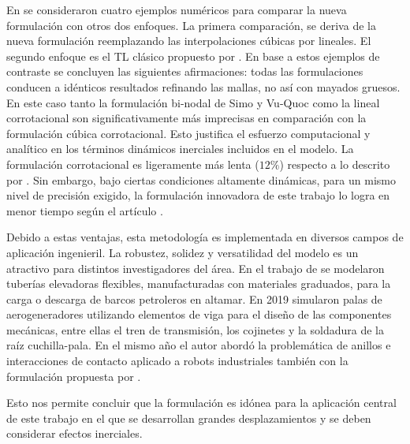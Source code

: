 En \cite{Le2014} se consideraron cuatro ejemplos numéricos para comparar la nueva formulación con otros dos enfoques. La primera comparación, se deriva de la nueva formulación reemplazando las interpolaciones cúbicas por lineales. El segundo enfoque es el TL clásico propuesto por \cite{simo1988dynamics}. En base a estos ejemplos de contraste se concluyen las siguientes afirmaciones: todas las formulaciones conducen a idénticos resultados refinando las mallas, no así con mayados gruesos. En este caso tanto la formulación bi-nodal de Simo y Vu-Quoc como la lineal corrotacional son significativamente más imprecisas en comparación con la formulación cúbica corrotacional. Esto justifica el esfuerzo computacional y analítico en los términos dinámicos inerciales incluidos en el modelo. La formulación corrotacional es ligeramente más lenta ($12\%$) respecto a lo descrito por \cite{simo1988dynamics}. Sin embargo, bajo ciertas condiciones altamente dinámicas, para un mismo nivel de precisión exigido, la formulación innovadora de este trabajo lo logra en menor tiempo según el artículo \citep{Le2014}.  

Debido a estas ventajas, esta metodología es implementada en diversos campos de aplicación ingenieril. La robustez, solidez y versatilidad del modelo es un atractivo para distintos investigadores del área. En el trabajo de \cite{albino2018co} se modelaron tuberías elevadoras flexibles, manufacturadas con materiales graduados, para la carga o descarga de barcos petroleros en altamar. En 2019 \cite{asadi2019multibody} simularon palas de aerogeneradores utilizando elementos de viga para el diseño de las componentes mecánicas, entre ellas el tren de transmisión, los cojinetes y la soldadura de la raíz cuchilla-pala. En el mismo año el autor \cite{barzanooni2018modeling} abordó la problemática de anillos e interacciones de contacto aplicado a robots industriales también con la formulación propuesta por \cite{Le2014}.

Esto nos permite concluir que la formulación es idónea para la aplicación central de este trabajo en el que se desarrollan grandes desplazamientos y se deben considerar efectos inerciales.
 

